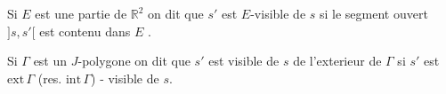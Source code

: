 %

%
\margin{\rule{.35pt}{1em}}%
Si $E$ est une partie de $\mathbb{R}^{2}$  on dit que $s'$ est $E$-visible de $s$ si le segment ouvert $]s,s'[$ est contenu dans $E$ .

\margin{\rule{.35pt}{1em}}Si $\Gamma$ est un $J$-polygone on dit que $s'$ est visible de $s$ de l'exterieur  de $\Gamma$ si $s'$ est $\mathrm{ext}\,\Gamma$ (res. $\mathrm{int}\,\Gamma$) - visible de $s$.\margin{\rule{.35pt}{1em}}
